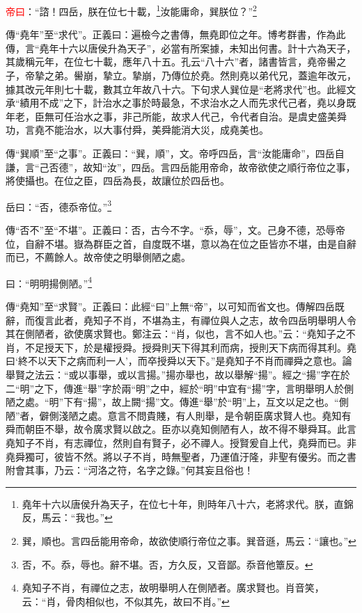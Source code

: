 \textcolor{red}{帝曰}：“諮！四岳，朕在位七十載，\footnote{堯年十六以唐侯升為天子，在位七十年，則時年八十六，老將求代。朕，直錦反，馬云：“我也。”}汝能庸命，巽朕位？”\footnote{巽，順也。言四岳能用帝命，故欲使順行帝位之事。巽音遜，馬云：“讓也。”}

{\noindent\zhuan{}\fzbyks 傳“堯年”至“求代”。正義曰：遍檢今之書傳，無堯即位之年。博考群書，作為此傳，言“堯年十六以唐侯升為天子”，必當有所案據，未知出何書。計十六為天子，其歲稱元年，在位七十載，應年八十五。孔云“八十六”者，諸書皆言，堯帝嚳之子，帝摯之弟。嚳崩，摯立。摯崩，乃傳位於堯。然則堯以弟代兄，蓋逾年改元，據其改元年則七十載，數其立年故八十六。下句求人巽位是“老將求代”也。此經文承“績用不成”之下，計治水之事於時最急，不求治水之人而先求代己者，堯以身既年老，臣無可任治水之事，非己所能，故求人代己，令代者自治。是虞史盛美舜功，言堯不能治水，以大事付舜，美舜能消大災，成堯美也。 \par}

{\noindent\zhuan{}\fzbyks 傳“巽順”至“之事”。正義曰：“巽，順”，文。帝呼四岳，言“汝能庸命”，四岳自謙，言“己否德”，故知“汝”，四岳。言四岳能用帝命，故帝欲使之順行帝位之事，將使攝也。在位之臣，四岳為長，故讓位於四岳也。 \par}

岳曰：“否，德忝帝位。”\footnote{否，不。忝，辱也。辭不堪。否，方久反，又音鄙。忝音他簟反。}

{\noindent\zhuan{}\fzbyks 傳“否不”至“不堪”。正義曰：否，古今不字。“忝，辱”，文。己身不德，恐辱帝位，自辭不堪。嶽為群臣之首，自度既不堪，意以為在位之臣皆亦不堪，由是自辭而已，不薦餘人。故帝使之明舉側陋之處。 \par}

曰：“明明揚側陋。”\footnote{堯知子不肖，有禪位之志，故明舉明人在側陋者。廣求賢也。肖音笑，云：“肖，骨肉相似也，不似其先，故曰不肖。”}

{\noindent\zhuan{}\fzbyks 傳“堯知”至“求賢”。正義曰：此經“曰”上無“帝”，以可知而省文也。傳解四岳既辭，而復言此者，堯知子不肖，不堪為主，有禪位與人之志，故令四岳明舉明人令其在側陋者，欲使廣求賢也。鄭注云：“肖，似也，言不如人也。”云：“堯知子之不肖，不足授天下，於是權授舜。授舜則天下得其利而病，授則天下病而得其利。堯曰‘終不以天下之病而利一人’，而卒授舜以天下。”是堯知子不肖而禪舜之意也。論舉賢之法云：“或以事舉，或以言揚。”揚亦舉也，故以舉解“揚”。經之“揚”字在於二“明”之下，傳進“舉”字於兩“明”之中，經於“明”中宜有“揚”字，言明舉明人於側陋之處。“明”下有“揚”，故上闕“揚”文。傳進“舉”於“明”上，互文以足之也。“側陋”者，僻側淺陋之處。意言不問貴賤，有人則舉，是令朝臣廣求賢人也。堯知有舜而朝臣不舉，故令廣求賢以啟之。臣亦以堯知側陋有人，故不得不舉舜耳。此言堯知子不肖，有志禪位，然則自有賢子，必不禪人。授賢爰自上代，堯舜而已。非堯舜獨可，彼皆不然。將以子不肖，時無聖者，乃運值汙隆，非聖有優劣。而之書附會其事，乃云：“河洛之符，名字之錄。”何其妄且俗也！ \par}

